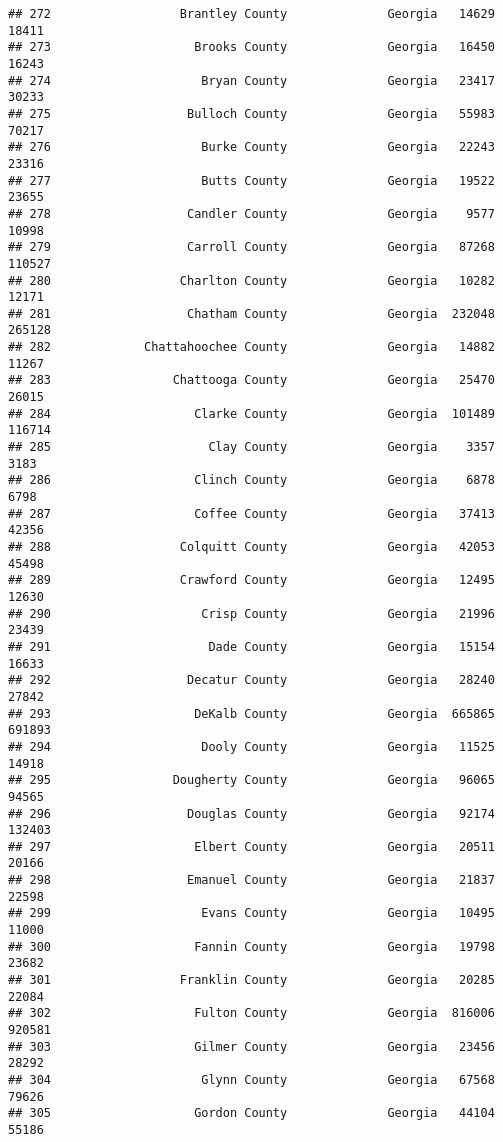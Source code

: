 \documentclass[
]{article}
\begin{document}
\begin{verbatim}
## 272                  Brantley County              Georgia   14629   18411
## 273                    Brooks County              Georgia   16450   16243
## 274                     Bryan County              Georgia   23417   30233
## 275                   Bulloch County              Georgia   55983   70217
## 276                     Burke County              Georgia   22243   23316
## 277                     Butts County              Georgia   19522   23655
## 278                   Candler County              Georgia    9577   10998
## 279                   Carroll County              Georgia   87268  110527
## 280                  Charlton County              Georgia   10282   12171
## 281                   Chatham County              Georgia  232048  265128
## 282             Chattahoochee County              Georgia   14882   11267
## 283                 Chattooga County              Georgia   25470   26015
## 284                    Clarke County              Georgia  101489  116714
## 285                      Clay County              Georgia    3357    3183
## 286                    Clinch County              Georgia    6878    6798
## 287                    Coffee County              Georgia   37413   42356
## 288                  Colquitt County              Georgia   42053   45498
## 289                  Crawford County              Georgia   12495   12630
## 290                     Crisp County              Georgia   21996   23439
## 291                      Dade County              Georgia   15154   16633
## 292                   Decatur County              Georgia   28240   27842
## 293                    DeKalb County              Georgia  665865  691893
## 294                     Dooly County              Georgia   11525   14918
## 295                 Dougherty County              Georgia   96065   94565
## 296                   Douglas County              Georgia   92174  132403
## 297                    Elbert County              Georgia   20511   20166
## 298                   Emanuel County              Georgia   21837   22598
## 299                     Evans County              Georgia   10495   11000
## 300                    Fannin County              Georgia   19798   23682
## 301                  Franklin County              Georgia   20285   22084
## 302                    Fulton County              Georgia  816006  920581
## 303                    Gilmer County              Georgia   23456   28292
## 304                     Glynn County              Georgia   67568   79626
## 305                    Gordon County              Georgia   44104   55186

\end{verbatim}
\end{document}
